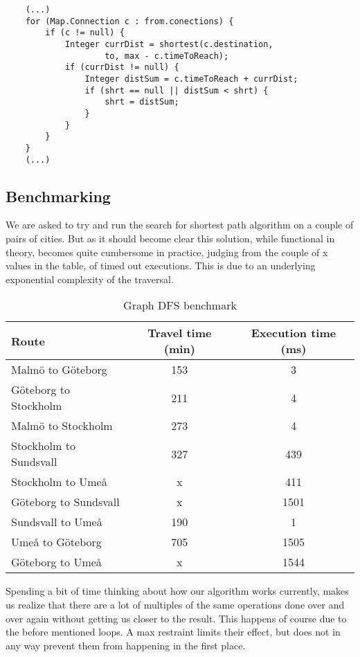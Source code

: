 \documentclass[a4paper,11pt]{article}
\begin{document}
\begin{verbatim}
    (...)
    for (Map.Connection c : from.conections) {
        if (c != null) {
            Integer currDist = shortest(c.destination, 
                    to, max - c.timeToReach);
            if (currDist != null) {
                Integer distSum = c.timeToReach + currDist;
                if (shrt == null || distSum < shrt) {
                    shrt = distSum;
                }
            }
        }
    }
    (...)
\end{verbatim}

\subsection*{Benchmarking}

We are asked to try and run the search for shortest path algorithm on a couple of pairs of cities. But as it should become clear this solution, while functional in theory, becomes quite cumbersome in practice, judging from the couple of x values in the table, of timed out executions. This is due to an underlying exponential complexity of the traversal.

\begin{table}[H]
\begin{center}
\begin{tabular}{l|c|c}
\textbf{Route} & \textbf{Travel time (min)} & \textbf{Execution time (ms)}\\
\hline
  Malmö to Göteborg      &  153 &     3 \\
  Göteborg to Stockholm       &  211 &    4 \\
  Malmö to Stockholm  &  273 &   4 \\
  Stockholm to Sundsvall  &  327 &   439 \\
  Stockholm to Umeå  &  x &   411 \\
  Göteborg to Sundsvall  &  x &   1501 \\
  Sundsvall to Umeå  &  190 &   1 \\
  Umeå to Göteborg  &  705 &   1505 \\
  Göteborg to Umeå  &  x &   1544 \\
\end{tabular}
\caption{Graph DFS benchmark}
\label{tab:table1}
\end{center}
\end{table}

Spending a bit of time thinking about how our algorithm works currently, makes us realize that there are a lot of multiples of the same operations done over and over again without getting us closer to the result. This happens of course due to the before mentioned loops. A max restraint limits their effect, but does not in any way prevent them from happening in the first place.
\end{document}
